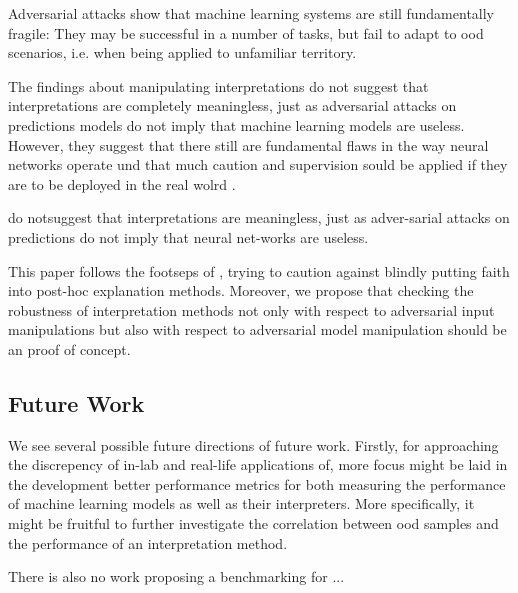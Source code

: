 Adversarial attacks show that machine learning systems are still fundamentally fragile: They may be successful in a number of tasks, but fail to adapt to ood scenarios, i.e. when being applied to unfamiliar territory. 

 The findings about manipulating interpretations do not suggest that interpretations are completely meaningless, just as adversarial attacks on predictions models do not imply that machine learning models are useless. However, they suggest that there still are fundamental flaws in the way neural networks operate und that much caution and supervision sould be applied if they are to be deployed in the real wolrd .


do  notsuggest that interpretations are meaningless, just as adver-sarial  attacks  on  predictions  do  not  imply  that  neural  net-works are useless. 

This paper follows the footseps of \cite{lipton2018mythos}, trying to caution against blindly putting faith into post-hoc explanation methods. 
Moreover, we propose that checking the robustness of interpretation methods not only with respect to adversarial input manipulations but also with respect to adversarial model manipulation should be an proof of concept. 




\subsection{Future Work}
We see several possible future directions of future work. 
Firstly, for approaching the discrepency of in-lab and real-life applications of, more focus might be laid in the development better performance metrics for both measuring the performance of machine learning models as well as their interpreters. 
More specifically, it might be fruitful to further investigate the correlation between ood samples and the performance of an interpretation method.


There is also no work proposing a benchmarking for ... 
